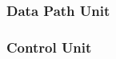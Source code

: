 \documentclass[a4paper, twoside, 11pt]{article}
\begin{document}

        \subsubsection{Data Path Unit}\label{sh:data-path-unit}
    
        \subsubsection{Control Unit}\label{subsubsec:sh-elimination-control-unit}
\end{document}
